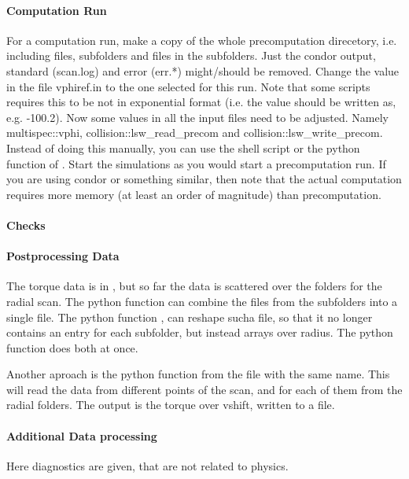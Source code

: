 \paragraph{Computation Run}
For a computation run, make a copy of the whole precomputation
direcetory, i.e. including files, subfolders and files in the
subfolders. Just the condor output, standard (scan.log) and error
(err.*) might/should be removed. Change the value in the file vphiref.in
to the one selected for this run. Note that some scripts requires this
to be not in exponential format (i.e. the value should be written as,
e.g. -100.2). Now some values in all the input files need to be adjusted.
Namely multispec::vphi, collision::lsw\_read\_precom and
collision::lsw\_write\_precom.
Instead of doing this manually, you can use the shell script
 or the python function  of
.
Start the simulations as you would start a precomputation run. If you are
using condor or something similar, then note that the actual computation
requires more memory (at least an order of magnitude) than
precomputation.

\paragraph{Checks}

\paragraph{Postprocessing Data}
The torque data is in , but so far the
data is scattered over the folders for the radial scan. The python
function  can
combine the files from the subfolders into a single file. The python
function , can reshape sucha file, so that
it no longer contains an entry for each subfolder, but instead arrays
over radius. The python function  does
both at once.

Another aproach is the python function  from
the file with the same name. This will read the data from different
points of the scan, and for each of them from the radial folders. The
output is the torque over vshift, written to a file.

\paragraph{Additional Data processing}
Here diagnostics are given, that are not related to physics.

